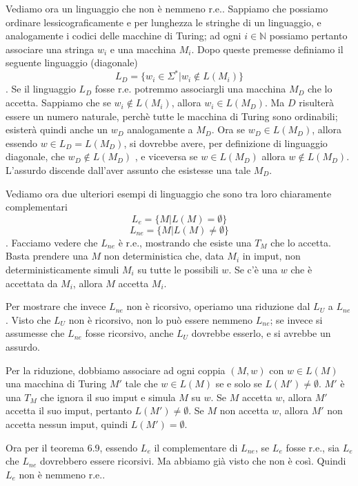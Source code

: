 Vediamo ora un linguaggio che non è nemmeno r.e.. Sappiamo che possiamo ordinare lessicograficamente e per lunghezza le stringhe di un linguaggio, e analogamente i codici delle macchine di Turing; ad ogni $i\in\mathbb{N}$ possiamo pertanto associare una stringa $w_i$ e una macchina $M_i$. Dopo queste premesse definiamo il seguente linguaggio (diagonale)
\[ L_D=\{w_i\in\Sigma^*|w_i\notin L(M_i)\}\].
Se il linguaggio $L_D$ fosse r.e. potremmo associargli una macchina $M_D$ che lo accetta. Sappiamo che se $w_i\notin L(M_i)$, allora $w_i\in L(M_D)$. Ma $D$ risulterà essere un numero naturale, perchè tutte le macchina di Turing sono ordinabili; esisterà quindi anche un $w_D$ analogamente a $M_D$. Ora se $w_D\in L(M_D)$, allora essendo $w\in L_D=L(M_D)$, si dovrebbe avere, per definizione di linguaggio diagonale, che $w_D\notin L(M_D)$ , e viceversa se $w\in L(M_D)$ allora $w\notin L(M_D)$. L'assurdo discende dall'aver assunto che esistesse una tale $M_D$.

Vediamo ora due ulteriori esempi di linguaggio che sono tra loro chiaramente complementari
\[L_e=\{M|L(M)=\emptyset\}\]\[L_{ne}=\{M|L(M)\neq\emptyset\}\].
Facciamo vedere che $L_{ne}$ è r.e., mostrando che esiste una $T_M$ che lo accetta. Basta prendere una $M$ non deterministica che, data $M_i$ in imput, non deterministicamente simuli $M_i$ su tutte le possibili $w$. Se c'è una $w$ che è accettata da $M_i$, allora $M$ accetta $M_i$.

Per mostrare che invece $L_{ne}$ non è ricorsivo, operiamo una riduzione dal $L_U$ a $L_{ne}$. Visto che $L_U$ non è ricorsivo, non lo può essere nemmeno $L_{ne}$; se invece si assumesse che $L_{ne}$ fosse ricorsivo, anche $L_U$ dovrebbe esserlo, e si avrebbe un assurdo.

Per la riduzione, dobbiamo associare ad ogni coppia $(M,w)$ con $w\in L(M)$ una macchina di Turing $M'$ tale che $w\in L(M)$ se e solo se $L(M')\neq\emptyset$. $M'$ è una $T_M$ che ignora il suo imput e simula $M$ su $w$. Se $M$ accetta $w$, allora $M'$ accetta il suo imput, pertanto $L(M')\neq\emptyset$. Se $M$ non accetta $w$, allora $M'$ non accetta nessun imput, quindi $L(M')=\emptyset$.

Ora per il teorema 6.9, essendo $L_e$ il complementare di $L_{ne}$, se $L_e$ fosse r.e., sia $L_e$ che $L_{ne}$ dovrebbero essere ricorsivi. Ma abbiamo già visto che non è così. Quindi $L_e$ non è nemmeno r.e..

